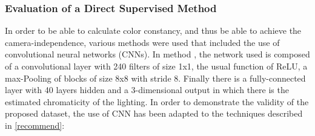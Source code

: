 \subsubsection{Evaluation of a Direct Supervised Method}
In order to be able to calculate color constancy, and thus be able to achieve 
the camera-independence, various methods were used that included the use 
of convolutional neural networks (CNNs). In method \cite{0807099122}, the network used 
is composed of a convolutional layer with 240 filters of size 1x1, the usual 
function of ReLU, a max-Pooling of blocks of size 8x8 with stride 8. Finally 
there is a fully-connected layer with 40 layers hidden and a 3-dimensional 
output in which there is the estimated chromaticity of the lighting. In order to demonstrate the validity of the proposed dataset, the use of CNN has been adapted to the techniques described in \ref{recommend}:
